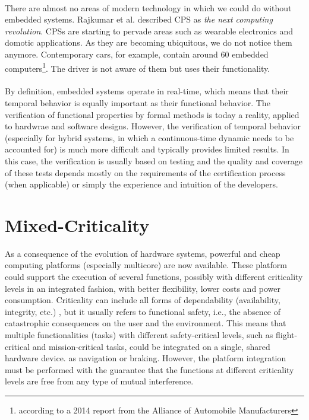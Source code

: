 \paragraph{}There are almost no areas of modern technology in which we could do without embedded systems. Rajkumar et al. \cite{Raj10} described CPS as \emph{the next computing revolution}. CPSs are starting to pervade areas such as wearable electronics and domotic applications. As they are becoming ubiquitous, we do not notice them anymore. Contemporary cars, for example, contain around 60 embedded computers\footnote{according to a 2014 report from the Alliance of Automobile Manufacturers}. The driver is not aware of them but uses their functionality.

\paragraph{}By definition, embedded systems operate in real-time, which means that their temporal behavior is equally important as their functional behavior. The verification of functional properties by formal methods is today a reality, applied to hardwrae and software designs. However, the verification of temporal behavior (especially for hybrid systems, in which a continuous-time dynamic needs to be accounted for) is much more difficult and typically provides limited results. In this case, the verification is usually based on testing and the quality and coverage of these tests depends mostly on the requirements of the certification process (when applicable) or simply the experience and intuition of the developers. 


\section{Mixed-Criticality}
As a consequence of the evolution of hardware systems, powerful and cheap computing platforms (especially multicore) are now available. These platform could support the execution of several functions, possibly with different criticality levels in an integrated fashion, with better flexibility, lower costs and power consumption. Criticality can include all forms of dependability (availability, integrity, etc.) \cite{dependability}, but it usually refers to functional safety, i.e., the absence of catastrophic consequences on the user and the environment. %
This means that multiple functionalities (tasks) with different safety-critical levels, such as flight-critical and mission-critical tasks, could be integrated on a single, shared hardware device. as navigation or braking. However, the platform integration must be performed with the guarantee that the functions at different criticality levels are free from any type of mutual interference.

